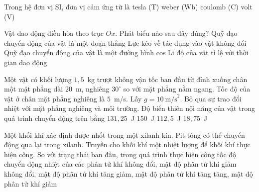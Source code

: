 	\begin{ex}%
		Trong hệ đơn vị SI, đơn vị cảm ứng từ là
		\choice
		{\True tesla (T)}
		{weber (Wb)}
		{coulomb (C)}
		{volt (V)}
	\end{ex}

	\begin{ex}%
		Vật dao động điều hòa theo trục $Ox$. Phát biểu nào sau đây đúng?
		\choice
		{\True Quỹ đạo chuyển động của vật là một đoạn thẳng}
		{Lực kéo về tác dụng vào vật không đổi}
		{Quỹ đạo chuyển động của vật là một đường hình cos}
		{Li độ của vật tỉ lệ với thời gian dao động}
	\end{ex}

	\begin{ex}%
		Một vật có khối lượng $1{,}5$~kg trượt không vận tốc ban đầu từ đỉnh xuống chân một mặt phẳng dài $20$~m, nghiêng $30^\circ$ so với mặt phẳng nằm ngang. Tốc độ của vật ở chân mặt phẳng nghiêng là $5$~m/s. Lấy $g=10~\text{m/s}^2$. Bỏ qua sự trao đổi nhiệt với mặt phẳng nghiêng và môi trường. Độ biến thiên nội năng của vật trong quá trình chuyển động trên bằng
		\choice
		{\True $131{,}25$~J}
		{$150$~J}
		{$112{,}5$~J}
		{$18{,}75$~J}
	\end{ex}

	\begin{ex}%
		Một khối khí xác định được nhốt trong một xilanh kín. Pit-tông có thể chuyển động qua lại trong xilanh. Truyền cho khối khí một nhiệt lượng để khối khí thực hiện công. So với trạng thái ban đầu, trong quá trình thực hiện công tốc độ chuyển động nhiệt của các phân tử khí
		\choice
		{không đổi, mật độ phân tử khí giảm}
		{không đổi, mật độ phân tử khí tăng}
		{giảm, mật độ phân tử khí tăng}
		{\True tăng, mật độ phân tử khí giảm}
	\end{ex}

